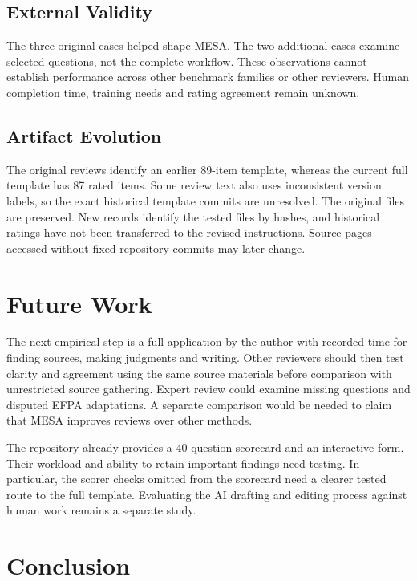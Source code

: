 \documentclass[conference]{IEEEtran}
\begin{document}
    \subsection{External Validity}
    
        The three original cases helped shape MESA. The two additional cases examine selected questions, not the complete workflow. These observations cannot establish performance across other benchmark families or other reviewers. Human completion time, training needs and rating agreement remain unknown.
    
    \subsection{Artifact Evolution}

        The original reviews identify an earlier 89-item template, whereas the current full template has 87 rated items. Some review text also uses inconsistent version labels, so the exact historical template commits are unresolved. The original files are preserved. New records identify the tested files by hashes, and historical ratings have not been transferred to the revised instructions. Source pages accessed without fixed repository commits may later change.

\section{Future Work}
\label{sec:future}

    The next empirical step is a full application by the author with recorded time for finding sources, making judgments and writing. Other reviewers should then test clarity and agreement using the same source materials before comparison with unrestricted source gathering. Expert review could examine missing questions and disputed EFPA adaptations. A separate comparison would be needed to claim that MESA improves reviews over other methods.

    The repository already provides a 40-question scorecard and an interactive form. Their workload and ability to retain important findings need testing. In particular, the scorer checks omitted from the scorecard need a clearer tested route to the full template. Evaluating the AI drafting and editing process against human work remains a separate study.

\section{Conclusion}
\end{document}
